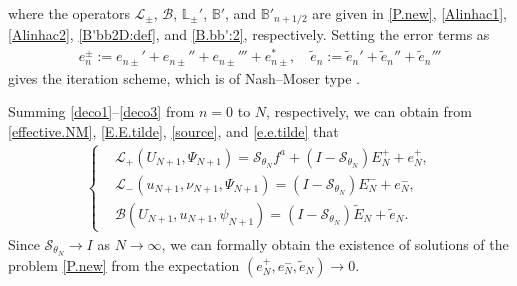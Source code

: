 \documentclass[twoside,11pt]{article}
\numberwithin{equation}{section}
\begin{document}
where the operators $\mathcal{L}_{\pm}$, $\mathcal{B}$,
$\mathbb{L}_{\pm}'$,
$\mathbb{B}'$, and $\mathbb{B}'_{n+1/2}$ are given in
\eqref{P.new}, \eqref{Alinhac1}, \eqref{Alinhac2},
\eqref{B'bb2D:def}, and \eqref{B.bb':2}, respectively.
Setting the error terms as
\begin{align} \label{e.e.tilde}
	e_{{n}}^{\pm}:=e_{{n}\pm}'+e_{{n}\pm}''+e_{{n}\pm}'''+e_{n\pm}^*,\quad
	\tilde{e}_{{n}} :=\tilde{e}_{{n} }'+\tilde{e}_{{n} }''+\tilde{e}_{{n} }'''
\end{align}
gives the iteration scheme, which is of Nash--Moser type \cite{A89MR976971,H76MR0602181,CS08MR2423311}.

Summing \eqref{deco1}--\eqref{deco3} from ${n}=0$ to $N$, respectively,
we can obtain from \eqref{effective.NM}, \eqref{E.E.tilde}, \eqref{source}, and \eqref{e.e.tilde} that
\begin{align}
	\label{LB:conver}
	\left\{
	\begin{aligned}
		&	\mathcal{L}_+(U_{N+1},\Psi_{N+1})= \mathcal{S}_{\theta_{N}}f^a
		+({I}-\mathcal{S}_{\theta_{N}})E_{N}^+ +e_{N}^+,
		\\
		&\mathcal{L}_-(u_{N+1}, \nu_{N+1}, \Psi_{N+1})=({I}-\mathcal{S}_{\theta_{N}})E_{N}^- +e_{N}^-,
		\\
		&\mathcal{B}(U_{N+1},u_{N+1}, \psi_{N+1})=({I}-\mathcal{S}_{\theta_{N}})\widetilde{E}_{N}
		+\tilde{e}_{{N}}.
	\end{aligned}
	\right.
\end{align}
Since $\mathcal{S}_{\theta_{N}}\to {I}$ as $N\to \infty$,
we can formally obtain the existence of solutions of the problem \eqref{P.new}
from the expectation $(e_{{N}}^{+},e_{{N}}^{-}, \tilde{e}_{N})\to 0$.







\end{document}
